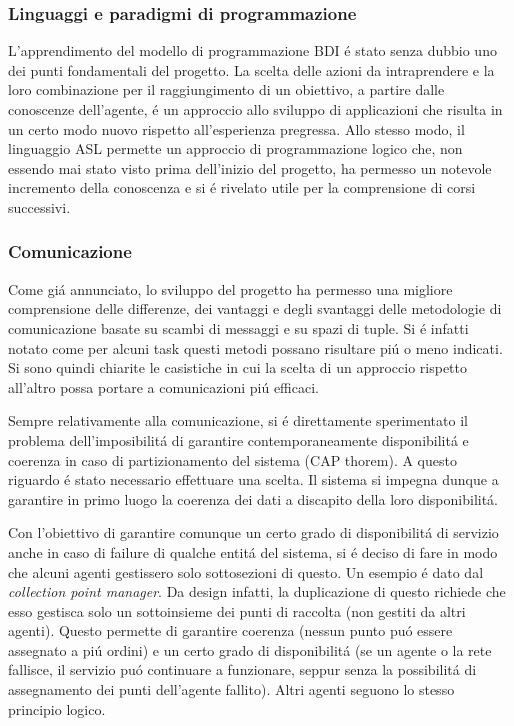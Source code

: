 \subsubsection{Linguaggi e paradigmi di programmazione}
L'apprendimento del modello di programmazione BDI \'e stato senza dubbio uno dei punti fondamentali del progetto. La scelta delle azioni da intraprendere e la loro combinazione per il raggiungimento di un obiettivo, a partire dalle conoscenze dell'agente, \'e un approccio allo sviluppo di applicazioni che risulta in un certo modo nuovo rispetto all'esperienza pregressa. Allo stesso modo, il linguaggio ASL permette un approccio di programmazione logico che, non essendo mai stato visto prima dell'inizio del progetto, ha permesso un notevole incremento della conoscenza e si \'e rivelato utile per la comprensione di corsi successivi.

\subsubsection{Comunicazione}
Come gi\'a annunciato, lo sviluppo del progetto ha permesso una migliore comprensione delle differenze, dei vantaggi e degli svantaggi delle metodologie di comunicazione basate su scambi di messaggi e su spazi di tuple. Si \'e infatti notato come per alcuni task questi metodi possano risultare pi\'u o meno indicati. Si sono quindi chiarite le casistiche in cui la scelta di un approccio rispetto all'altro possa portare a comunicazioni pi\'u efficaci.

\parag %
Sempre relativamente alla comunicazione, si \'e direttamente sperimentato il problema dell'imposibilit\'a di garantire contemporaneamente disponibilit\'a e coerenza in caso di partizionamento del sistema (CAP thorem). A questo riguardo \'e stato necessario effettuare una scelta. Il sistema si impegna dunque a garantire in primo luogo la coerenza dei dati a discapito della loro disponibilit\'a.

Con l'obiettivo di garantire comunque un certo grado di disponibilit\'a di servizio anche in caso di failure di qualche entit\'a del sistema, si \'e deciso di fare in modo che alcuni agenti gestissero solo sottosezioni di questo. Un esempio \'e dato dal \textit{collection point manager}. Da design infatti, la duplicazione di questo richiede che esso gestisca solo un sottoinsieme dei punti di raccolta (non gestiti da altri agenti). Questo permette di garantire coerenza (nessun punto pu\'o essere assegnato a pi\'u ordini) e un certo grado di disponibilit\'a (se un agente o la rete fallisce, il servizio pu\'o continuare a funzionare, seppur senza la possibilit\'a di assegnamento dei punti dell'agente fallito). Altri agenti seguono lo stesso principio logico.

